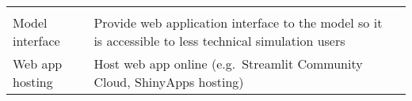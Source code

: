 \begin{longtable}[]{@{}lll@{}}
\begin{minipage}[t]{0.30\columnwidth}
\end{minipage} & \begin{minipage}[t]{0.30\columnwidth}\raggedright
\strut
\end{minipage}\tabularnewline
\begin{minipage}[t]{0.30\columnwidth}\raggedright
Model interface\strut
\end{minipage} & \begin{minipage}[t]{0.30\columnwidth}\raggedright
Provide web application interface to the model so it is accessible to
less technical simulation users\strut
\end{minipage} & \begin{minipage}[t]{0.30\columnwidth}\raggedright
\strut
\end{minipage}\tabularnewline
\begin{minipage}[t]{0.30\columnwidth}\raggedright
Web app hosting\strut
\end{minipage} & \begin{minipage}[t]{0.30\columnwidth}\raggedright
Host web app online (e.g.~Streamlit Community Cloud, ShinyApps
hosting)\strut
\end{minipage} & \begin{minipage}[t]{0.30\columnwidth}\raggedright
\strut
\end{minipage}\tabularnewline
\bottomrule
\end{longtable}
